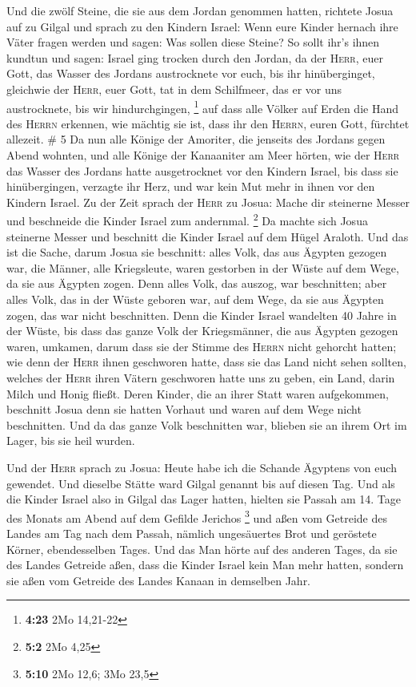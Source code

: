  Und die zwölf Steine, die sie aus dem Jordan genommen
hatten, richtete Josua auf zu Gilgal  und sprach zu den
Kindern Israel: Wenn eure Kinder hernach ihre Väter fragen werden und
sagen: Was sollen diese Steine?  So sollt ihr's ihnen
kundtun und sagen: Israel ging trocken durch den Jordan, 
da der \textsc{Herr}, euer Gott, das Wasser des Jordans austrocknete vor
euch, bis ihr hinüberginget, gleichwie der \textsc{Herr}, euer Gott, tat
in dem Schilfmeer, das er vor uns austrocknete, bis wir hindurchgingen,
\footnote{\textbf{4:23} 2Mo 14,21-22}  auf dass alle
Völker auf Erden die Hand des \textsc{Herrn} erkennen, wie mächtig sie
ist, dass ihr den \textsc{Herrn}, euren Gott, fürchtet allezeit. \# 5
 Da nun alle Könige der Amoriter, die jenseits des Jordans
gegen Abend wohnten, und alle Könige der Kanaaniter am Meer hörten, wie
der \textsc{Herr} das Wasser des Jordans hatte ausgetrocknet vor den
Kindern Israel, bis dass sie hinübergingen, verzagte ihr Herz, und war
kein Mut mehr in ihnen vor den Kindern Israel.  Zu der
Zeit sprach der \textsc{Herr} zu Josua: Mache dir steinerne Messer und
beschneide die Kinder Israel zum andernmal. \footnote{\textbf{5:2} 2Mo
  4,25}  Da machte sich Josua steinerne Messer und
beschnitt die Kinder Israel auf dem Hügel Araloth.  Und
das ist die Sache, darum Josua sie beschnitt: alles Volk, das aus
Ägypten gezogen war, die Männer, alle Kriegsleute, waren gestorben in
der Wüste auf dem Wege, da sie aus Ägypten zogen.  Denn
alles Volk, das auszog, war beschnitten; aber alles Volk, das in der
Wüste geboren war, auf dem Wege, da sie aus Ägypten zogen, das war nicht
beschnitten.  Denn die Kinder Israel wandelten 40 Jahre in
der Wüste, bis dass das ganze Volk der Kriegsmänner, die aus Ägypten
gezogen waren, umkamen, darum dass sie der Stimme des \textsc{Herrn}
nicht gehorcht hatten; wie denn der \textsc{Herr} ihnen geschworen
hatte, dass sie das Land nicht sehen sollten, welches der \textsc{Herr}
ihren Vätern geschworen hatte uns zu geben, ein Land, darin Milch und
Honig fließt.  Deren Kinder, die an ihrer Statt waren
aufgekommen, beschnitt Josua denn sie hatten Vorhaut und waren auf dem
Wege nicht beschnitten.  Und da das ganze Volk beschnitten
war, blieben sie an ihrem Ort im Lager, bis sie heil wurden.

 Und der \textsc{Herr} sprach zu Josua: Heute habe ich die
Schande Ägyptens von euch gewendet. Und dieselbe Stätte ward Gilgal
genannt bis auf diesen Tag.  Und als die Kinder Israel
also in Gilgal das Lager hatten, hielten sie Passah am 14. Tage des
Monats am Abend auf dem Gefilde Jerichos \footnote{\textbf{5:10} 2Mo
  12,6; 3Mo 23,5}  und aßen vom Getreide des Landes am
Tag nach dem Passah, nämlich ungesäuertes Brot und geröstete Körner,
ebendesselben Tages.  Und das Man hörte auf des anderen
Tages, da sie des Landes Getreide aßen, dass die Kinder Israel kein Man
mehr hatten, sondern sie aßen vom Getreide des Landes Kanaan in
demselben Jahr.

